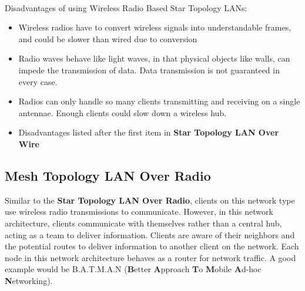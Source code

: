 \documentclass[onecolumn, draftclsnofoot,10pt, compsoc]{IEEEtran}
\begin{document}
		\noindent \\Disadvantages of using Wireless Radio Based Star Topology LANs:
		\begin{itemize}
			\item Wireless radios have to convert wireless signals into understandable frames, and could be slower than wired due to conversion
			\item Radio waves behave like light waves, in that physical objects like walls, can impede the transmission of data.  Data transmission is not guaranteed in every case.
			\item Radios can only handle so many clients transmitting and receiving on a single antennae. Enough clients could slow down a wireless hub.
			\item Disadvantages listed after the first item in \textbf{Star Topology LAN Over Wire}
		\end{itemize}


		\subsection{Mesh Topology LAN Over Radio}
		Similar to the \textbf{Star Topology LAN Over Radio}, clients on this network type use wireless radio transmissions to communicate.
		However, in this network architecture, clients communicate with themselves rather than a central hub, acting as a team to deliver information.
		Clients are aware of their neighbors and the potential routes to deliver information to another client on the network.
		Each node in this network architecture behaves as a router for network traffic.
		A good example would be B.A.T.M.A.N (\textbf{B}etter \textbf{A}pproach \textbf{T}o \textbf{M}obile \textbf{A}d-hoc \textbf{N}etworking).  \cite{LAN4}
\end{document}
